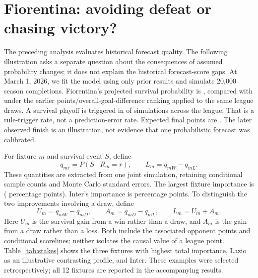 \documentclass[11pt]{article}
\begin{document}
\section{Fiorentina: avoiding defeat or chasing victory?}
The preceding analysis evaluates historical forecast quality. The following
illustration asks a separate question about the consequences of assumed
probability changes; it does not explain the historical forecast-score gaps.
At March 1, 2026, we fit the model using only prior results and simulate 20,000
season completions. Fiorentina's projected survival probability is
\FioSurvival{}, compared with \FioSimplified{} under the earlier
points/overall-goal-difference ranking applied to the same league draws.
A survival playoff is triggered in \PlayoffFrequency{} of simulations across
the league. That is a rule-trigger rate, not a prediction-error rate.
Expected final points are \FioPoints{}. The later observed finish is an
illustration, not evidence that one probabilistic forecast was calibrated.

For fixture $m$ and survival event $S$, define
\[
 q_{mr}=P(S\mid R_m=r),\qquad
 L_m=q_{mW}-q_{mL}.
\]
These quantities are extracted from one joint simulation, retaining
conditional sample counts and Monte Carlo standard errors.
The largest fixture importance is \TopOpponent{} (\TopImportance{}
percentage points). Inter's importance is \InterImportance{} percentage points.
To distinguish the two improvements involving a draw, define
\[
 U_m=q_{mW}-q_{mD},\qquad A_m=q_{mD}-q_{mL},\qquad L_m=U_m+A_m.
\]
Here $U_m$ is the survival gain from a win rather than a draw, and $A_m$ is the
gain from a draw rather than a loss. Both include the associated opponent
points and conditional scorelines; neither isolates the causal value of a
league point. Table~\ref{tab:stakes} shows the three fixtures with highest
total importance, Lazio as an illustrative contrasting profile, and Inter.
These examples were selected retrospectively; all 12 fixtures are reported
in the accompanying results.

\begin{table}[ht]
\centering
\caption{Fiorentina's conditional survival stakes at March 1, 2026.
$U$ and $A$ are percentage-point differences; $A/U$ is dimensionless.
Brackets contain approximate 95\% simulation-only intervals (normal for
differences, Fieller for ratios), conditional on the fitted model.
They exclude parameter and specification uncertainty.}
\label{tab:stakes}

\end{table}
\end{document}
